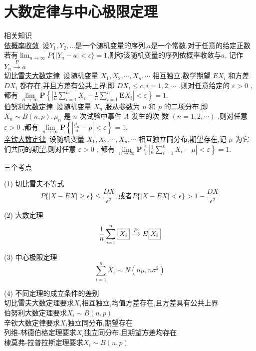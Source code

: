 \documentclass[12pt, a4paper, oneside, UTF8]{ctexbook}
\begin{document}
% 
\else
\fi

\chapter{大数定律与中心极限定理}
\begin{remark}
    相关知识 \\
    \underline{依概率收敛}\ 设$Y_1,Y_2,\ldots$是一个随机变量的序列,$a$是一个常数,对于任意的给定正数
    若有$\lim_{n\to\infty}P\{\left|Y_n-a\right|<\epsilon\}=1$,则称该随机变量的序列依概率收敛与$a$,
    记作$Y_n\xrightarrow{P}a$ \\
    \underline{切比雪夫大数定律}\ 
    设随机变量 ${X}_{1},{X}_{2},\cdots ,{X}_{n},\cdots$ 相互独立,数学期望 $E{X}_{i}$ 和方差 $D{X}_{i}$ 都存在,并且方差有公共上界,即
    $D{X}_{i} \leq  c,i = 1,2,\cdots$ ,则对任意给定的 $\varepsilon  > 0$ ,都有
    $\mathop{\lim }\limits_{{n \rightarrow  \infty }}\mathbf{P}\left\{  {\left| {\frac{1}{n}\mathop{\sum }\limits_{{i = 1}}^{n}{X}_{i} - \frac{1}{n}\mathop{\sum }\limits_{{i = 1}}^{n}\mathbf{E}{X}_{i}}\right|  < \varepsilon }\right\}   = 1.$ \\
    \underline{伯努利大数定律}\ 
    设随机变量 ${X}_{n}$ 服从参数为 $n$ 和 $p$ 的二项分布,即 ${X}_{n} \sim  B\left( {n,p}\right) ,{\mu }_{n}$ 是 $n$ 次试验中事件 $A$ 发生的次
    数 $\left( {n = 1,2,\cdots }\right)$ ,则对任意 $\varepsilon  > 0$ ,都有
    $\mathop{\lim }\limits_{{n \rightarrow  \infty }}\mathbf{P}\left\{  {\left| {\frac{{\mu }_{n}}{n} - p}\right|  < \varepsilon }\right\}   = 1.$ \\
    \underline{辛钦大数定律}\ 
    设随机变量 ${X}_{1},{X}_{2},\cdots ,{X}_{n},\cdots$ 相互独立同分布,期望存在,记 $\mu$ 为它们共同的期望,则对任意 $\varepsilon  > 0$ ,
    都有
    $\mathop{\lim }\limits_{{n \rightarrow  \infty }}\mathbf{P}\left\{  {\left| {\frac{1}{n}\mathop{\sum }\limits_{{i = 1}}^{n}{X}_{i} - \mu }\right|  < \varepsilon }\right\}   = 1.$
\end{remark}
\begin{remark}
    三个考点
    \item[(1)] 切比雪夫不等式 
    \[
    P\{\left|X-EX\right|\geq\epsilon\}\leq \frac{DX}{\epsilon^2},
    \text{或者}P\{\left|X-EX\right| < \epsilon\}>1-\frac{DX}{\epsilon^2}
    \]
    \item[(2)] 大数定理 
    \[
    \frac{1}{n}\sum_{i=1}^{n}\fbox{$X_i$}\xrightarrow{P}E\fbox{$X_i$}
    \]
    \item[(3)] 中心极限定理
    \[
    \sum_{i=1}^{n}X_i\sim N(n\mu,n\sigma^2)
    \]
    \item[(4)]不同定理的成立条件的差别  \\
    切比雪夫大数定理要求$X_i$相互独立,均值方差存在,且方差具有公共上界 \\
    伯努利大数定理要求$X_i\sim B(n,p)$ \\
    辛钦大数定律要求$X_i$独立同分布,期望存在 \\
    列维-林德伯格定理要求$X_i$独立同分布,且期望方差均存在 \\
    棣莫弗-拉普拉斯定理要求$X_i\sim B(n,p)$
\end{remark}
\end{document}
